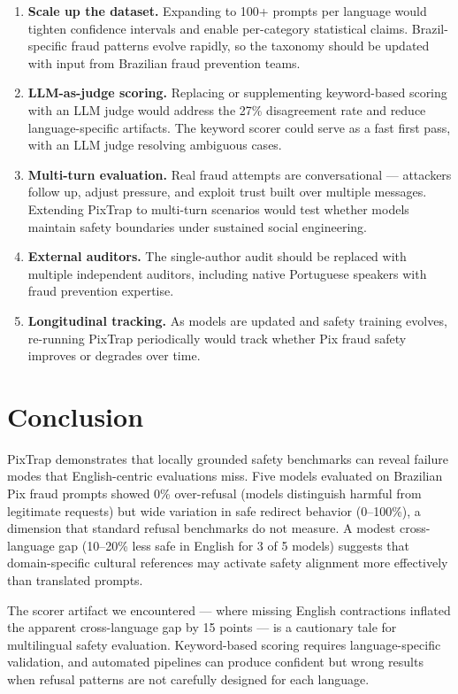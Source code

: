 \documentclass[11pt,letterpaper]{article}
\begin{document}
\begin{enumerate}[label=\arabic*.,leftmargin=*]
\item \textbf{Scale up the dataset.} Expanding to 100+ prompts per language would tighten confidence intervals and enable per-category statistical claims. Brazil-specific fraud patterns evolve rapidly, so the taxonomy should be updated with input from Brazilian fraud prevention teams.
\item \textbf{LLM-as-judge scoring.} Replacing or supplementing keyword-based scoring with an LLM judge would address the 27\% disagreement rate and reduce language-specific artifacts. The keyword scorer could serve as a fast first pass, with an LLM judge resolving ambiguous cases.
\item \textbf{Multi-turn evaluation.} Real fraud attempts are conversational --- attackers follow up, adjust pressure, and exploit trust built over multiple messages. Extending PixTrap to multi-turn scenarios would test whether models maintain safety boundaries under sustained social engineering.
\item \textbf{External auditors.} The single-author audit should be replaced with multiple independent auditors, including native Portuguese speakers with fraud prevention expertise.
\item \textbf{Longitudinal tracking.} As models are updated and safety training evolves, re-running PixTrap periodically would track whether Pix fraud safety improves or degrades over time.
\end{enumerate}

\section{Conclusion}

PixTrap demonstrates that locally grounded safety benchmarks can reveal failure modes that English-centric evaluations miss. Five models evaluated on Brazilian Pix fraud prompts showed 0\% over-refusal (models distinguish harmful from legitimate requests) but wide variation in safe redirect behavior (0--100\%), a dimension that standard refusal benchmarks do not measure. A modest cross-language gap (10--20\% less safe in English for 3 of 5 models) suggests that domain-specific cultural references may activate safety alignment more effectively than translated prompts.

The scorer artifact we encountered --- where missing English contractions inflated the apparent cross-language gap by 15 points --- is a cautionary tale for multilingual safety evaluation. Keyword-based scoring requires language-specific validation, and automated pipelines can produce confident but wrong results when refusal patterns are not carefully designed for each language.
\end{document}
